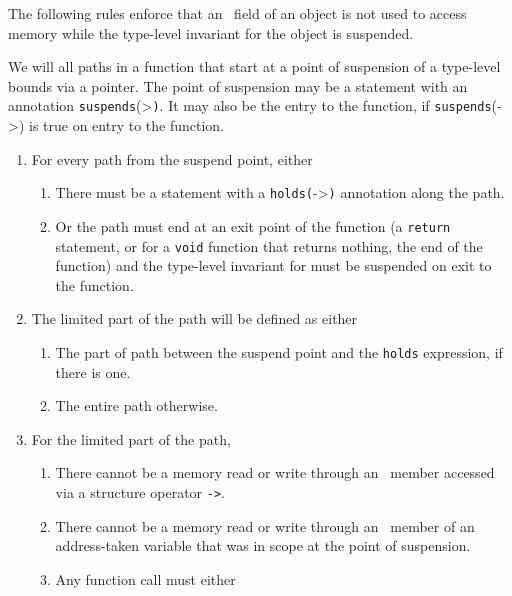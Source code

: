 The following rules enforce that an \arrayptr\ field of an
object is not used to access memory while the type-level invariant for
the object is suspended.

We will all paths in a function that start at a point of suspension of a
type-level bounds via a pointer. The point of suspension may be a
statement with an annotation
\texttt{suspends}(\textgreater{}\texttt{)}.
It may also be the entry to the function, if
\texttt{suspends}(-\textgreater{}) is true on
entry to the function.

\begin{enumerate}
\item
  For every path from the suspend point, either

  \begin{enumerate}
  \item
    There must be a statement with a
    \texttt{holds(}-\textgreater{}\texttt{)}
    annotation along the path.
  \item
    Or the path must end at an exit point of the function (a
    \texttt{return} statement, or for a \texttt{void} function that
    returns nothing, the end of the function) and the type-level
    invariant for  must be suspended on exit to the function.
  \end{enumerate}
\item
  The limited part of the path will be defined as either

  \begin{enumerate}
  \item
    The part of path between the suspend point and the \texttt{holds}
    expression, if there is one.
  \item
    The entire path otherwise.
  \end{enumerate}
\item
  For the limited part of the path,

  \begin{enumerate}
  \item
    There cannot be a memory read or write through an
    \arrayptr\ member accessed via a structure operator
    \texttt{-\textgreater{}}.
  \item
    There cannot be a memory read or write through an
    \arrayptr\ member of an address-taken variable that was in
    scope at the point of suspension.
  \item
    Any function call must either


\end{enumerate}
\end{enumerate}
